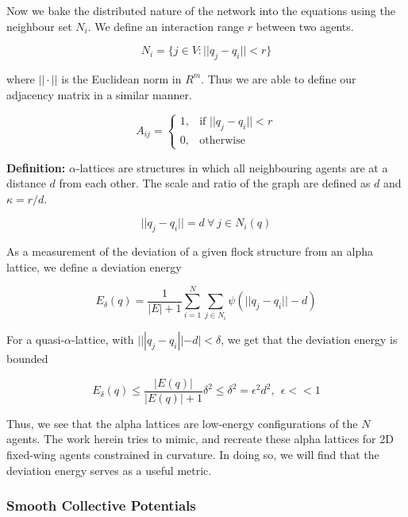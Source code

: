 \documentclass[letterpaper, 10 pt, conference]{ieeeconf}  %
\begin{document}
Now we bake the distributed nature of the network into the equations using the neighbour set $N_i$. We define an interaction range $r$ between two agents. 

\begin{equation}
    N_i = \{j \in V:||q_j-q_i||<r\}
\end{equation}

where $||\cdot||$ is the Euclidean norm in $R^m$. Thus we are able to define our adjacency matrix in a similar manner. 

\begin{equation}
    A_{ij} = 
    \begin{cases}
        1, & \text{if } ||q_j-q_i|| < r \\
        0, & \text{otherwise}
    \end{cases}
\end{equation}

\textbf{Definition\cite{1605401}:} $\alpha$-lattices are structures in which all neighbouring agents are at a distance $d$ from each other. The scale and ratio of the graph are defined as $d$ and $\kappa = r/d$. 

\begin{equation}
    ||q_j-q_i|| = d \ \forall \ j \in N_i(q)
\end{equation}

As a measurement of the deviation of a given flock structure from an alpha lattice, we define a deviation energy

\begin{equation}
    E_{\delta}(q) = \frac{1}{|E|+1}\sum_{i=1}^N\sum_{j\in N_i}\psi (||q_j-q_i|| - d)
\end{equation}

For a quasi-$\alpha$-lattice, with $|||q_j-q_i|| - d| < \delta$, we get that the deviation energy is bounded

\begin{equation}
    E_\delta(q) \leq \frac{|E(q)|}{|E(q)|+1} \delta^2 \leq \delta^2 = \epsilon^2d^2, \ \ \epsilon << 1
\end{equation}

Thus, we see that the alpha lattices are low-energy configurations of the $N$ agents. The work herein tries to mimic, and recreate these alpha lattices for 2D fixed-wing agents constrained in curvature. In doing so, we will find that the deviation energy serves as a useful metric. 

\subsubsection{Smooth Collective Potentials}
\end{document}

